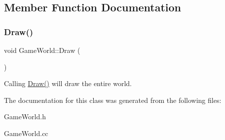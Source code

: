 \subsection{Member Function Documentation}
\mbox{\label{classGameWorld_a275418607d8286979b276f165ad5876b}} 
\subsubsection{\texorpdfstring{Draw()}{Draw()}}
{\footnotesize\ttfamily void Game\+World\+::\+Draw (\begin{DoxyParamCaption}{ }\end{DoxyParamCaption})}

Calling \hyperlink{classGameWorld_a275418607d8286979b276f165ad5876b}{Draw()} will draw the entire world. 

The documentation for this class was generated from the following files\+:\begin{DoxyCompactItemize}
\item 
Game\+World.\+h\item 
Game\+World.\+cc\end{DoxyCompactItemize}
